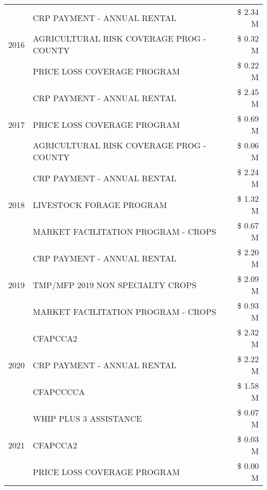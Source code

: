 \begin{tabular}{llr}
\cline{1-3}
\multirow[t]{3}{*}{2016} & CRP PAYMENT - ANNUAL RENTAL & \$ 2.34 M \\
 & AGRICULTURAL RISK COVERAGE PROG - COUNTY & \$ 0.32 M \\
 & PRICE LOSS COVERAGE PROGRAM & \$ 0.22 M \\
\cline{1-3}
\multirow[t]{3}{*}{2017} & CRP PAYMENT - ANNUAL RENTAL & \$ 2.45 M \\
 & PRICE LOSS COVERAGE PROGRAM & \$ 0.69 M \\
 & AGRICULTURAL RISK COVERAGE PROG - COUNTY & \$ 0.06 M \\
\cline{1-3}
\multirow[t]{3}{*}{2018} & CRP PAYMENT - ANNUAL RENTAL & \$ 2.24 M \\
 & LIVESTOCK FORAGE PROGRAM & \$ 1.32 M \\
 & MARKET FACILITATION PROGRAM - CROPS & \$ 0.67 M \\
\cline{1-3}
\multirow[t]{3}{*}{2019} & CRP PAYMENT - ANNUAL RENTAL & \$ 2.20 M \\
 & TMP/MFP 2019 NON SPECIALTY CROPS & \$ 2.09 M \\
 & MARKET FACILITATION PROGRAM - CROPS & \$ 0.93 M \\
\cline{1-3}
\multirow[t]{3}{*}{2020} & CFAPCCA2 & \$ 2.32 M \\
 & CRP PAYMENT - ANNUAL RENTAL & \$ 2.22 M \\
 & CFAPCCCCA & \$ 1.58 M \\
\cline{1-3}
\multirow[t]{3}{*}{2021} & WHIP PLUS 3 ASSISTANCE & \$ 0.07 M \\
 & CFAPCCA2 & \$ 0.03 M \\
 & PRICE LOSS COVERAGE PROGRAM & \$ 0.00 M \\
\cline{1-3}
\bottomrule
\end{tabular}
